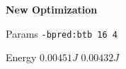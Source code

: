 
        \begin{tcolorbox}[width=\linewidth, colback=white!95!black, colframe=white!95!black]
            \begin{center}\textbf{New Optimization}\end{center}

            \tcblower
            
            Params \hfill \verb|-bpred:btb 16 4|

            Energy \hfill \st{$0.00451J$} $0.00432J$

        \end{tcolorbox}
    